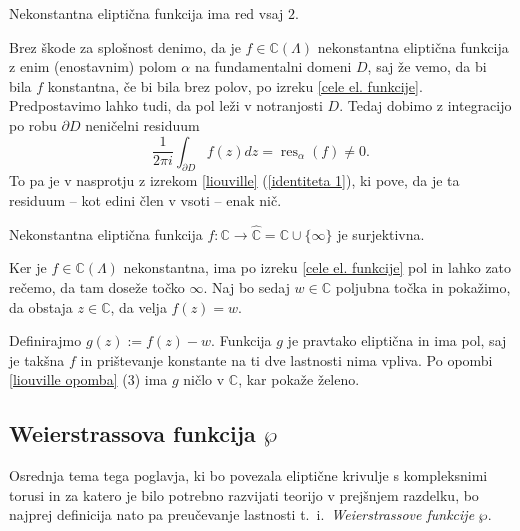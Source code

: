 \documentclass[mat1]{fmfdelo}
\numberwithin{equation}{section}
\newcommand{\C}{\mathbb C}
\newcommand{\RS}{\widehat{\C}}
\newcommand{\elf}{\C(\Lambda)}
\newcommand{\res}[2]{\operatorname{res}_{#1}(#2)}
\theoremstyle{definition}
\begin{document}
\begin{zgled*}
\end{zgled*}

\begin{posledica}
    \label{poseldica o redu elipticne funkcije}
    Nekonstantna eliptična funkcija ima red vsaj $2$.
\end{posledica}

\begin{dokaz}
    Brez škode za splošnost denimo, da je $f \in \elf$ nekonstantna eliptična funkcija z enim (enostavnim) polom $\alpha$ na fundamentalni domeni $D$, saj že vemo, da bi bila $f$ konstantna, če bi bila brez polov, po izreku \ref{cele el. funkcije}. 
    Predpostavimo lahko tudi, da pol leži v notranjosti $D$. Tedaj dobimo z integracijo po robu $\partial D$ neničelni residuum
    \[
        \frac{1}{2 \pi i} \int_{\partial D} f(z)dz = \res{\alpha}{f} \neq 0.  
    \]
    To pa je v nasprotju z izrekom \ref{liouville} (\ref{identiteta 1}), ki pove, da je ta residuum -- kot edini člen v vsoti -- enak nič. 
\end{dokaz}

\begin{posledica}
    Nekonstantna eliptična funkcija $f: \C \to \RS = \C \cup \{\infty\}$ je surjektivna. 
\end{posledica}

\begin{dokaz}
    Ker je $f \in \elf$ nekonstantna, ima po izreku \ref{cele el. funkcije} pol in lahko zato rečemo, da tam doseže točko $\infty$. Naj bo sedaj $w \in \C$ poljubna točka in pokažimo, da obstaja $z \in \C$, da velja $f(z) = w$.
    
    Definirajmo $g(z) := f(z) - w$. Funkcija $g$ je pravtako eliptična in ima pol, saj je takšna $f$ in prištevanje konstante na ti dve lastnosti nima vpliva. Po opombi \ref{liouville opomba} (3) ima $g$ ničlo v $\C$, kar pokaže želeno.
\end{dokaz}




\subsection{Weierstrassova funkcija $\wp$}

Osrednja tema tega poglavja, ki bo povezala eliptične krivulje s kompleksnimi torusi in za katero je bilo potrebno razvijati teorijo v prejšnjem razdelku, bo najprej definicija nato pa preučevanje lastnosti t.~i.\ \emph{Weierstrassove funkcije} $\wp$. 
\end{document}
